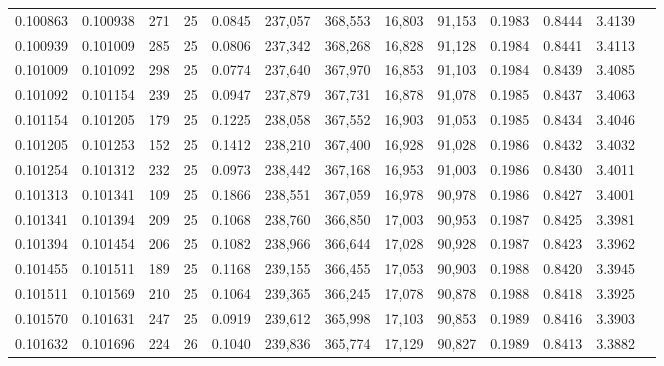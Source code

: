 \begin{tabular}{rrrrrrrrrrrrr}
0.100863 & 0.100938 &   271 &  25 &                                     0.0845 & 237,057 & 368,553 &  16,803 &  91,153 & 0.1983 & 0.8444 & 3.4139 \\
0.100939 & 0.101009 &   285 &  25 &                                     0.0806 & 237,342 & 368,268 &  16,828 &  91,128 & 0.1984 & 0.8441 & 3.4113 \\
0.101009 & 0.101092 &   298 &  25 &                                     0.0774 & 237,640 & 367,970 &  16,853 &  91,103 & 0.1984 & 0.8439 & 3.4085 \\
0.101092 & 0.101154 &   239 &  25 &                                     0.0947 & 237,879 & 367,731 &  16,878 &  91,078 & 0.1985 & 0.8437 & 3.4063 \\
0.101154 & 0.101205 &   179 &  25 &                                     0.1225 & 238,058 & 367,552 &  16,903 &  91,053 & 0.1985 & 0.8434 & 3.4046 \\
0.101205 & 0.101253 &   152 &  25 &                                     0.1412 & 238,210 & 367,400 &  16,928 &  91,028 & 0.1986 & 0.8432 & 3.4032 \\
0.101254 & 0.101312 &   232 &  25 &                                     0.0973 & 238,442 & 367,168 &  16,953 &  91,003 & 0.1986 & 0.8430 & 3.4011 \\
0.101313 & 0.101341 &   109 &  25 &                                     0.1866 & 238,551 & 367,059 &  16,978 &  90,978 & 0.1986 & 0.8427 & 3.4001 \\
0.101341 & 0.101394 &   209 &  25 &                                     0.1068 & 238,760 & 366,850 &  17,003 &  90,953 & 0.1987 & 0.8425 & 3.3981 \\
0.101394 & 0.101454 &   206 &  25 &                                     0.1082 & 238,966 & 366,644 &  17,028 &  90,928 & 0.1987 & 0.8423 & 3.3962 \\
0.101455 & 0.101511 &   189 &  25 &                                     0.1168 & 239,155 & 366,455 &  17,053 &  90,903 & 0.1988 & 0.8420 & 3.3945 \\
0.101511 & 0.101569 &   210 &  25 &                                     0.1064 & 239,365 & 366,245 &  17,078 &  90,878 & 0.1988 & 0.8418 & 3.3925 \\
0.101570 & 0.101631 &   247 &  25 &                                     0.0919 & 239,612 & 365,998 &  17,103 &  90,853 & 0.1989 & 0.8416 & 3.3903 \\
0.101632 & 0.101696 &   224 &  26 &                                     0.1040 & 239,836 & 365,774 &  17,129 &  90,827 & 0.1989 & 0.8413 & 3.3882 \\

\end{tabular}
